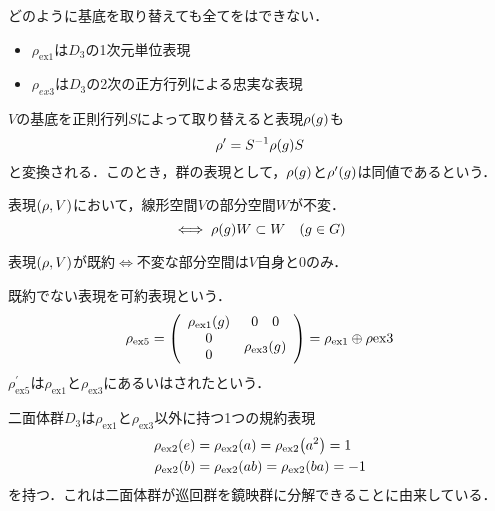 \documentclass[main]{subfiles}
\begin{document}
		どのように基底を取り替えても全てをはできない．
		\begin{itemize}
			\item $\rho_\text{ex1}$は$D_3$の1次元単位表現
			\item $\rho_{ex3}$は$D_3$の2次の正方行列による忠実な表現
		\end{itemize}
		\begin{dfn}
			$V$の基底を正則行列$S$によって取り替えると表現$\rho\qty(g)$も
			\[\rho^\prime=S^{-1}\rho\qty(g)S\]
			と変換される．このとき，群の表現として，$\rho\qty(g)$と$\rho^\prime\qty(g)$は同値であるという．
		\end{dfn}
		\begin{dfn}
			表現$\qty(\rho,V)$において，線形空間$V$の部分空間$W$が不変．
			\[\iff\rho\qty(g)W\subset W\quad\qty(g\in G)\]
		\end{dfn}
		\begin{dfn}
			表現$\qty(\rho,V)$が既約$\iff$不変な部分空間は$V$自身と$\qty{0}$のみ．
		\end{dfn}
		\begin{dfn}
			既約でない表現を可約表現という．
			\[\rho_\text{ex5}=\qty(\begin{array}{cc}
						\rho_\text{ex1}\qty(g)                & {\begin{array}{cc} 0 & 0 \end{array}} \\
						{\begin{array}{c} 0 \\ 0 \end{array}} & \rho_\text{ex3}\qty(g)
					\end{array})=\rho_\text{ex1}\oplus\rho\text{ex3}\]
			$\rho_\text{ex5}^\prime$は$\rho_\text{ex1}$と$\rho_\text{ex3}$にあるいはされたという．
		\end{dfn}
		二面体群$D_3$は$\rho_\text{ex1}$と$\rho_\text{ex3}$以外に持つ1つの規約表現
		\begin{align*}
			\rho_\text{ex2}\qty(e) & =\rho_\text{ex2}\qty(a)=\rho_\text{ex2}\qty(a^2)=1  \\
			\rho_\text{ex2}\qty(b) & =\rho_\text{ex2}\qty(ab)=\rho_\text{ex2}\qty(ba)=-1
		\end{align*}
		を持つ．これは二面体群が巡回群を鏡映群に分解できることに由来している．

\end{document}
